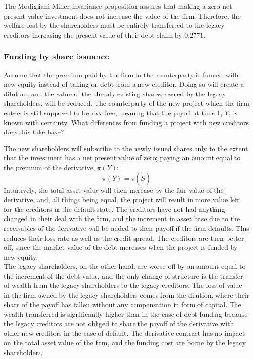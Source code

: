 \documentclass[../main.tex]{subfiles}
\begin{document}
        The Modigliani-Miller invariance proposition assures that making a zero net present value investment does not increase the value of the firm.
        Therefore, the welfare lost by the shareholders must be entirely transferred to the legacy creditors increasing the present value of their debt claim by $0.2771$.


    \subsubsection{Funding by share issuance}
        Assume that the premium paid by the firm to the counterparty is funded with new equity instead of taking on debt from a new creditor. Doing so will create a dilution, and the value of the already existing shares, owned by the legacy shareholders, will be reduced. The counterparty of the new project which the firm enters is still supposed to be risk free, meaning that the payoff at time 1, $Y$, is known with certainty. What differences from funding a project with new creditors does this take have?

        The new shareholders will subscribe to the newly issued shares only to the extent that the investment has a net present value of zero; paying an amount equal to the premium of the derivative, $\pi(Y)$:
        \begin{equation}
            \pi(Y) = \pi(\tilde{S})
        \end{equation}
        Intuitively, the total asset value will then increase by the fair value of the derivative, and, all things being equal, the project will result in more value left for the creditors in the default state. The creditors have not had anything changed in their deal with the firm, and the increment in asset base due to the receivables of the derivative will be added to their payoff if the firm defaults. This reduces their loss rate as well as the credit spread. The creditors are then better off, since the market value of the debt increases when the project is funded by new equity.\\
        The legacy shareholders, on the other hand, are worse off by an amount equal to the increment of the debt value, and the only change of structure is the transfer of wealth from the legacy shareholders to the legacy creditors. The loss of value in the firm owned by the legacy shareholders comes from the dilution, where their share of the payoff has fallen without any compensation in form of capital. The wealth transferred is significantly higher than in the case of debt funding because the legacy creditors are not obliged to share the payoff of the derivative with other new creditors in the case of default. The derivative contract has no impact on the total asset value of the firm, and the funding cost are borne by the legacy shareholders.
\end{document}
